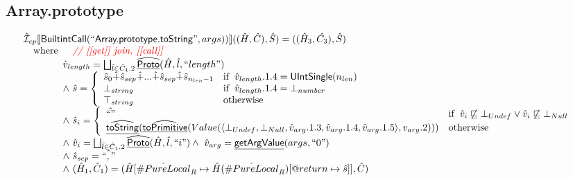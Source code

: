 \documentclass{article}
\makeatletter
\newcommand{\SF}[1]{\mbox{\textsf{#1}}}
\newcommand{\comment}[1]{\textit{#1}}
\newcommand{\wherec}[1]{{\rm where}\begin{array}[t]{l}#1\end{array}}
\newcommand{\ifc}[1]{{\rm if}\begin{array}[t]{l}#1\end{array}}
\newcommand{\owc}{{\rm otherwise}}
\newcommand{\aI}{\hat{\mathcal{I}}}
\newcommand{\lbr}{\llbracket}
\newcommand{\rbr}{\rrbracket}
\newcommand{\hf}[1]{\underline{\sf #1}}
\newcommand{\ahf}[1]{\widehat{\underline{\sf #1}}}
\newcommand{\varprop}[1]{@#1}
\newcommand{\avarloc}[1]{\hat{\##1}}
\def\inred{\color{red}}
\def\inred{\color{red}}
\makeatother
\begin{document}
\subsection{Array.prototype}
\[
\begin{array}{l}
\aI _{cp}\lbr \SF{BuiltintCall}(``\SF{Array.prototype.toString}",args))\rbr((\hat{H},\hat{C}), \hat{S})
  = ((\hat{H}_3, \hat{C_3}), \hat{S})\\
\quad\wherec{
  \quad\comment{{\inred // [[get]] join, [[call]] }}\\
  \hat{v}_{length} = \bigsqcup_{\hat{l} \in \hat{C}_1.2}  \ahf{Proto}(\hat{H}, \hat{l}, ``length")\\
  \land\ \hat{s} = \left\{\begin{array}{ll}
      \hat{s}_0 \hat{+} \hat{s}_{sep} \hat{+} ... \hat{+} \hat{s}_{sep} \hat{+} \hat{s}_{n_{len} -1}& \ifc{\hat{v}_{length}.1.4 = \SF{UIntSingle}(n_{len})}\\
      \bot_{string} & \ifc{\hat{v}_{length}.1.4 = \bot_{number}}\\
      \top_{string} & \owc
    \end{array}\right.\\
  \land\ \hat{s}_i = \left\{\begin{array}{ll}
      \hat{``"} & \ifc{\hat{v}_i \not\sqsubseteq \bot_{Undef} \lor \hat{v}_i \not\sqsubseteq \bot_{Null}}\\
      \ahf{toString}(\ahf{toPrimitive}(Value(\langle\bot_{Undef}, \bot_{Null}, \hat{v}_{arg}.1.3, \hat{v}_{arg}.1.4, \hat{v}_{arg}.1.5\rangle, v_{arg}.2))) & \owc
    \end{array}\right.\\
  \land\ \hat{v}_i =  \bigsqcup_{\hat{l} \in \hat{C}_1.2}  \ahf{Proto}(\hat{H}, \hat{l}, ``i")
  \land\ \hat{v}_{arg} = \hf{getArgValue}(args, ``0")\\
  \land\ \hat{s}_{sep} = \hat{``,"} \\
  \land\ (\hat{H}_1, \hat{C}_1) = 
      (\hat{H}[\avarloc{PureLocal}_R \mapsto \hat{H}(\avarloc{PureLocal}_R)[\varprop{return} \mapsto \hat{s}]], \hat{C})\\
  }\\
\\\\


\end{array}\]
\end{document}
